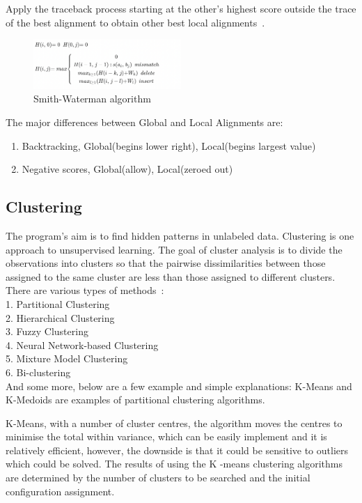 \documentclass[]{final_report}
\begin{document}
Apply the traceback process starting at the other's highest score outside the trace of the best alignment to obtain other best local alignments~\cite{attwood2003introduction}.

\begin{figure}[H]
    \centering
    \includegraphics[width=0.5\textwidth]{SW algo.png}
    \caption{Smith-Waterman algorithm}
    \label{fig:SW_algo}
\end{figure}

The major differences between Global and Local Alignments are:
\begin{enumerate}
    \item Backtracking, Global(begins lower right), Local(begins largest value)
    \item Negative scores, Global(allow), Local(zeroed out)
\end{enumerate}

\subsection{Clustering}
The program's aim is to find hidden patterns in unlabeled data. Clustering is one approach to unsupervised learning. The goal of cluster analysis is to divide the observations into clusters so that the pairwise dissimilarities between those assigned to the same cluster are less than those assigned to different clusters. There are various types of methods~\cite{clustering2021Prasad}:\\
1. Partitional Clustering\\
2. Hierarchical Clustering\\
3. Fuzzy Clustering\\
4. Neural Network-based Clustering\\
5. Mixture Model Clustering\\
6. Bi-clustering\\

And some more, below are a few example and simple explanations: K-Means and K-Medoids are examples of partitional clustering algorithms.

K-Means, with a number of cluster centres, the algorithm moves the centres to minimise the total within variance, which can be easily implement and it is relatively efficient, however, the downside is that it could be sensitive to outliers which could be solved. The results of using the K -means clustering algorithms are determined by the number of clusters to be searched and the initial configuration assignment.
\end{document}
